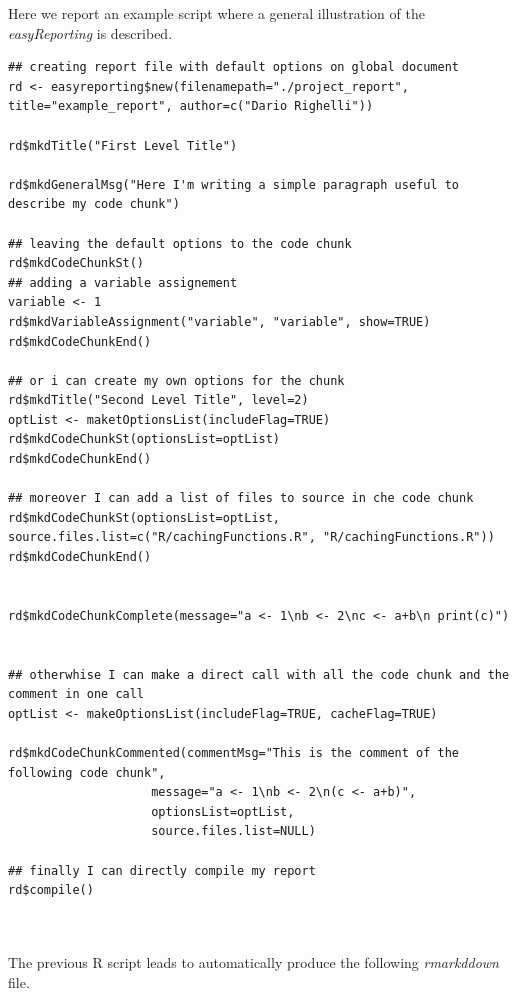 Here we report an example script where a general illustration of the \textit{easyReporting} is described.

\begin{lstlisting}
## creating report file with default options on global document
rd <- easyreporting$new(filenamepath="./project_report", title="example_report", author=c("Dario Righelli"))

rd$mkdTitle("First Level Title")

rd$mkdGeneralMsg("Here I'm writing a simple paragraph useful to describe my code chunk")

## leaving the default options to the code chunk
rd$mkdCodeChunkSt()
## adding a variable assignement
variable <- 1
rd$mkdVariableAssignment("variable", "variable", show=TRUE)
rd$mkdCodeChunkEnd()

## or i can create my own options for the chunk
rd$mkdTitle("Second Level Title", level=2)
optList <- maketOptionsList(includeFlag=TRUE)
rd$mkdCodeChunkSt(optionsList=optList)
rd$mkdCodeChunkEnd()

## moreover I can add a list of files to source in che code chunk
rd$mkdCodeChunkSt(optionsList=optList, source.files.list=c("R/cachingFunctions.R", "R/cachingFunctions.R"))
rd$mkdCodeChunkEnd()


rd$mkdCodeChunkComplete(message="a <- 1\nb <- 2\nc <- a+b\n print(c)")


## otherwhise I can make a direct call with all the code chunk and the comment in one call
optList <- makeOptionsList(includeFlag=TRUE, cacheFlag=TRUE)

rd$mkdCodeChunkCommented(commentMsg="This is the comment of the following code chunk",
                    message="a <- 1\nb <- 2\n(c <- a+b)",
                    optionsList=optList,
                    source.files.list=NULL)

## finally I can directly compile my report
rd$compile()



\end{lstlisting}
 
 
The previous R script leads to automatically produce the following \textit{rmarkddown} file.

